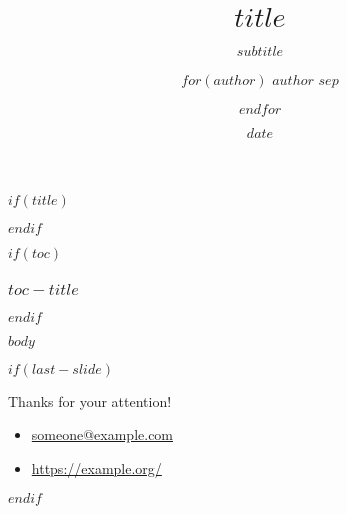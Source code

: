 \documentclass[$if(fontsize)$$fontsize$,$endif$$if(handout)$handout,$endif$$if(aspectratio)$aspectratio = $aspectratio$,$endif$]{beamer}
\title{$title$}
\subtitle{$subtitle$}
\author{$for(author)$ \texorpdfstring{$author$}{$author$} $sep$ \and $endfor$}
\date{$date$}
\institute{$for(institute)$$institute$$sep$ \and $endfor$}
\begin{document}
$if(title)$
\begin{frame}[plain]{}
  \titlepage
\end{frame}
$endif$

$if(toc)$
\begin{frame}
  \frametitle{$toc-title$}
  \tableofcontents
\end{frame}
$endif$

$body$

$if(last-slide)$
\begin{frame}{}
    \vspace{0.5cm}
    \begin{center}
        {\Large Thanks for your attention!}
    \end{center}
    \vfill
    \begin{itemize}
      \item[\faEnvelope] \href{mailto:someone@example.com}{someone@example.com} \\
      \item[\faLaptop] \href{https://example.org/}{https://example.org/}
    \end{itemize}
\end{frame}
$endif$
\end{document}
